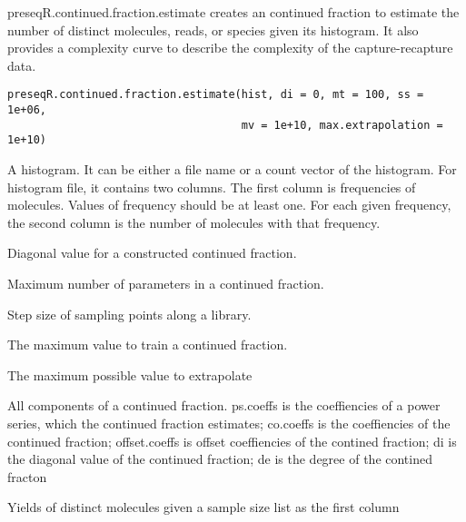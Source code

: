 \documentclass[letterpaper]{book}
\begin{document}
%
\begin{Description}\relax
preseqR.continued.fraction.estimate creates an continued fraction to estimate 
the number of distinct molecules, reads, or species given its histogram. It also
provides a complexity curve to describe the complexity of the capture-recapture
data.
\end{Description}
%
\begin{Usage}
\begin{verbatim}
preseqR.continued.fraction.estimate(hist, di = 0, mt = 100, ss = 1e+06, 
									mv = 1e+10, max.extrapolation = 1e+10)
\end{verbatim}
\end{Usage}
%
\begin{Arguments}
\begin{ldescription}
\item[\code{hist}] 
A histogram. It can be either a file name or a count vector of the 
histogram. For histogram file, it contains two columns. The first column
is frequencies of molecules. Values of frequency should be at least one.
For each given frequency, the second column is the number of molecules
with that frequency.

\item[\code{di}] 
Diagonal value for a constructed continued fraction.

\item[\code{mt}] 
Maximum number of parameters in a continued fraction.

\item[\code{ss}] 
Step size of sampling points along a library.

\item[\code{mv}] 
The maximum value to train a continued fraction.

\item[\code{max.extrapolation}] 
The maximum possible value to extrapolate

\end{ldescription}
\end{Arguments}
%
\begin{Value}
\begin{ldescription}
\item[\code{CF}] All components of a continued fraction. ps.coeffs is the 
coeffiencies of a power series, which the continued fraction estimates;
co.coeffs is the coeffiencies of the continued fraction; offset.coeffs is
offset coeffiencies of the contined fraction; di is the diagonal value of
the continued fraction; de is the degree of the contined fracton
\item[\code{yield.estimates}] Yields of distinct molecules given a sample size list
as the first column
\end{ldescription}
\end{Value}
\end{document}
